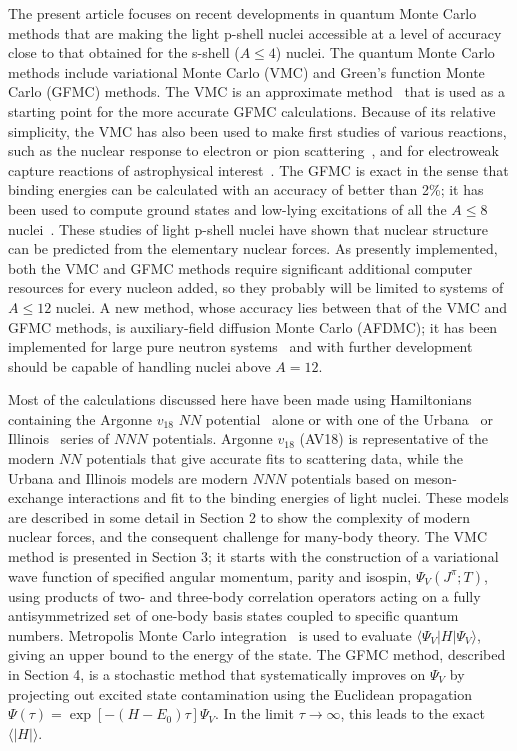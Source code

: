 The present article focuses on recent developments in quantum Monte Carlo 
methods that are making the light p-shell nuclei accessible at a level of 
accuracy close to that obtained for the s-shell ($A \leq 4$) nuclei.
The quantum Monte Carlo methods include variational Monte Carlo (VMC) and
Green's function Monte Carlo (GFMC) methods.
The VMC is an approximate method~\cite{LAPS81,CPW83,W91,APW95} that is used 
as a starting point for the more accurate GFMC calculations.
Because of its relative simplicity, the VMC has also been used to make first
studies of various reactions, such as the nuclear response to electron
\cite{WS98,LWW99} or pion scattering~\cite{LW01}, and for electroweak capture 
reactions of astrophysical interest~\cite{NWS01,N01}.
The GFMC is exact in the sense that binding energies can be calculated with an 
accuracy of better than 2\%; it has been used to compute ground states and 
low-lying excitations of all the $A \leq 8$ nuclei~\cite{C87,PPCW95,PPCPW97,
WPCP00}.
These studies of light p-shell nuclei have shown that
nuclear structure can be predicted from the elementary nuclear forces.
As presently implemented, both the VMC and GFMC methods require significant
additional computer resources for every nucleon added, so they probably will
be limited to systems of $A \leq 12$ nuclei.
A new method, whose accuracy lies between that of the VMC and GFMC methods, is
auxiliary-field diffusion Monte Carlo (AFDMC); it has been implemented 
for large pure neutron systems~\cite{SF99} and with further development should
be capable of handling nuclei above $A=12$.

Most of the calculations discussed here have been made using Hamiltonians 
containing the Argonne $v_{18}$ $N\!N$ potential~\cite{WSS95} alone or with 
one of the Urbana~\cite{CPW83} or Illinois~\cite{PPWC01} series of $N\!N\!N$ 
potentials.
Argonne $v_{18}$ (AV18) is representative of the modern 
$N\!N$ potentials that give accurate fits to scattering data, while the 
Urbana and Illinois models are modern $N\!N\!N$ potentials based on 
meson-exchange interactions and fit to the binding energies of light nuclei.
These models are described in some detail in Section 2 to show the complexity
of modern nuclear forces, and the consequent challenge for many-body theory.
The VMC method is presented in Section 3; it starts with the construction of a 
variational wave function of specified angular momentum, parity and isospin,
$\Psi_V(J^{\pi};T)$, using products of two- and three-body correlation 
operators acting on a fully antisymmetrized set of 
one-body basis states coupled to specific quantum numbers.
Metropolis Monte Carlo integration~\cite{MR2T2} is used to evaluate 
$\langle \Psi_V | H | \Psi_V \rangle$, giving an upper bound to the 
energy of the state.
The GFMC method, described in Section 4, is a stochastic method that 
systematically improves on $\Psi_V$ by projecting out excited
state contamination using the Euclidean propagation
$\Psi(\tau) = \exp [ - ( H - E_0) \tau ] \Psi_V$.
In the limit $\tau \rightarrow \infty$, this leads to the exact 
$\langle | H | \rangle$.

